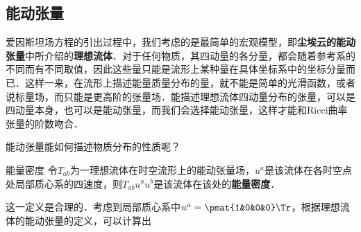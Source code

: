 

\subsection{能动张量}

爱因斯坦场方程的引出过程中，我们考虑的是最简单的宏观模型，即\textbf{尘埃云的能动张量}中所介绍的\textbf{理想流体}．对于任何物质，其四动量的各分量，都会随着参考系的不同而有不同取值，因此这些量只能是流形上某种量在具体坐标系中的坐标分量而已．这样一来，在流形上描述能量质量分布的量，就不能是简单的光滑函数，或者说标量场，而只能是更高阶的张量场．能描述理想流体四动量分布的张量，可以是四动量本身，也可以是能动张量，而我们会选择能动张量，这样才能和Ricci曲率张量的阶数吻合．

能动张量能如何描述物质分布的性质呢？

\begin{definition}{能量密度}
令$T_{ab}$为一理想流体在时空流形上的能动张量场，$u^a$是该流体在各时空点处局部质心系的四速度，则$T_{ab}u^au^b$是该流体在该处的\textbf{能量密度}．
\end{definition}

这一定义是合理的．考虑到局部质心系中$u^a=\pmat{1&0&0&0}\Tr$，根据理想流体的能动张量的定义，可以计算出












